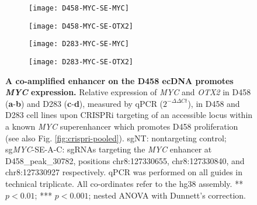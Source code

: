 \begin{figure}[!h]
    \centering
    \begin{subfigure}{.49\textwidth}
        \centering
        \texttt{[image: D458-MYC-SE-MYC]}
        \caption{}
        \label{subfig:d458-myc-se-myc}
    \end{subfigure}
    \begin{subfigure}{.49\textwidth}
        \centering
        \texttt{[image: D458-MYC-SE-OTX2]}
        \caption{}
        \label{subfig:d458-myc-se-otx2}
    \end{subfigure}
    \begin{subfigure}{.49\textwidth}
        \centering
        \texttt{[image: D283-MYC-SE-MYC]}
        \caption{}
        \label{subfig:d283-myc-se-myc}
    \end{subfigure}
    \begin{subfigure}{.49\textwidth}
        \centering
        \texttt{[image: D283-MYC-SE-OTX2]}
        \caption{}
        \label{subfig:d283-myc-se-otx2}
    \end{subfigure}
    \caption[A co-amplified enhancer on the D458 ecDNA promotes \textit{MYC} expression.]{\textbf{A co-amplified enhancer on the D458 ecDNA promotes \textit{MYC} expression.} Relative expression of \textit{MYC} and \textit{OTX2} in D458 (\textbf{a}-\textbf{b}) and D283 (\textbf{c}-\textbf{d}), measured by qPCR ($2^{-\Delta\Delta Ct}$), in D458 and D283 cell lines upon CRISPRi targeting of an accessible locus within a known \textit{MYC} superenhancer which promotes D458 proliferation (see also Fig. \ref{fig:crispri-pooled}). sgNT: nontargeting control; sg\textit{MYC}-SE-A-C: sgRNAs targeting the \textit{MYC} enhancer at D458\_peak\_30782, positions chr8:127330655, chr8:127330840, and chr8:127330927 respectively. qPCR was performed on all guides in technical triplicate. All co-ordinates refer to the hg38 assembly. ** $p < 0.01$; *** $p < 0.001$; nested ANOVA with Dunnett’s correction.
    }
    \label{fig:crispri-myc-se}
\end{figure}

